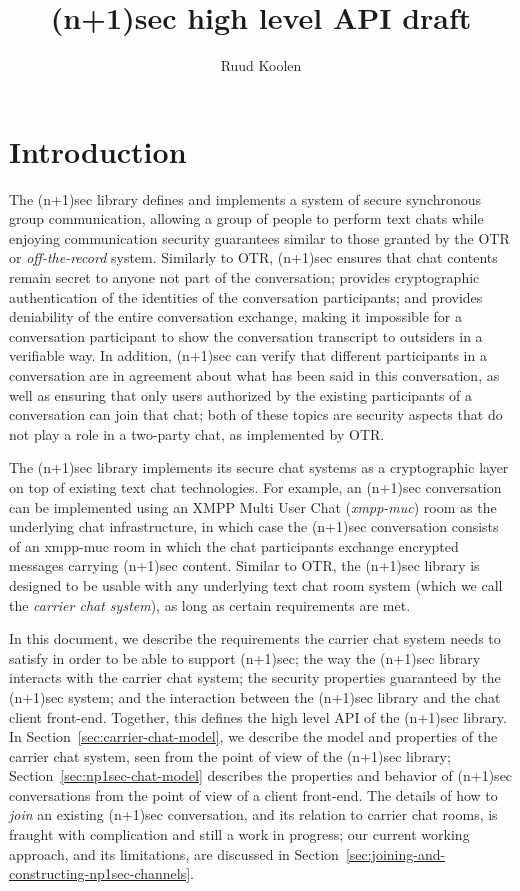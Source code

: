 \documentclass{article}
\title{(n+1)sec high level API draft}
\author{Ruud Koolen}
\begin{document}
\maketitle

\section{Introduction}
\label{sec:introduction}

The (n+1)sec library defines and implements a system of secure synchronous group communication, allowing a group of people to perform text chats while enjoying communication security guarantees similar to those granted by the OTR or \emph{off-the-record} system.
Similarly to OTR, (n+1)sec ensures that chat contents remain secret to anyone not part of the conversation; provides cryptographic authentication of the identities of the conversation participants; and provides deniability of the entire conversation exchange, making it impossible for a conversation participant to show the conversation transcript to outsiders in a verifiable way.
In addition, (n+1)sec can verify that different participants in a conversation are in agreement about what has been said in this conversation, as well as ensuring that only users authorized by the existing participants of a conversation can join that chat; both of these topics are security aspects that do not play a role in a two-party chat, as implemented by OTR.

The (n+1)sec library implements its secure chat systems as a cryptographic layer on top of existing text chat technologies.
For example, an (n+1)sec conversation can be implemented using an XMPP Multi User Chat (\emph{xmpp-muc}) room as the underlying chat infrastructure, in which case the (n+1)sec conversation consists of an xmpp-muc room in which the chat participants exchange encrypted messages carrying (n+1)sec content.
Similar to OTR, the (n+1)sec library is designed to be usable with any underlying text chat room system (which we call the \emph{carrier chat system}), as long as certain requirements are met.

In this document, we describe the requirements the carrier chat system needs to satisfy in order to be able to support (n+1)sec; the way the (n+1)sec library interacts with the carrier chat system; the security properties guaranteed by the (n+1)sec system; and the interaction between the (n+1)sec library and the chat client front-end.
Together, this defines the high level API of the (n+1)sec library.
In Section~\ref{sec:carrier-chat-model}, we describe the model and properties of the carrier chat system, seen from the point of view of the (n+1)sec library; Section~\ref{sec:np1sec-chat-model} describes the properties and behavior of (n+1)sec conversations from the point of view of a client front-end.
The details of how to \emph{join} an existing (n+1)sec conversation, and its relation to carrier chat rooms, is fraught with complication and still a work in progress; our current working approach, and its limitations, are discussed in Section~\ref{sec:joining-and-constructing-np1sec-channels}.
\end{document}
